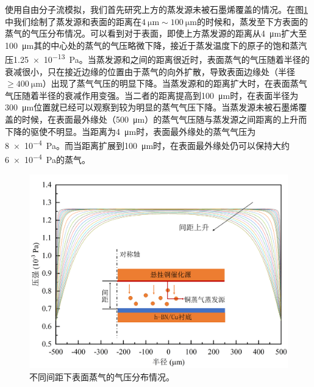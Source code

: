     使用自由分子流模拟，我们首先研究上方的蒸发源未被石墨烯覆盖的情况。在图\ref{fig:CG_FEM_fullCu}中我们绘制了蒸发源和表面的距离在$\SI{4}{\micro\meter} \sim \SI{100}{\micro\meter}$的时候和，蒸发至下方表面的蒸气的气压分布情况。可以看到对于表面，即使上方蒸发源的距离从\SI{4}{\micro\meter}扩大至\SI{100}{\micro\meter}其的中心处的蒸气的气压略微下降，接近于蒸发温度下的原子的饱和蒸汽压\SI{1.25e-13}{\pascal}。当蒸发源和之间的距离很近时，表面蒸气的气压随着半径的衰减很小，只在接近边缘的位置由于蒸气的向外扩散，导致表面边缘处（半径$\geqslant \SI{400}{\micro\meter}$）出现了蒸气气压的明显下降。当蒸发源和的距离扩大时，在表面蒸气气压随着半径的衰减作用变强。当二者的距离提高到\SI{100}{\micro\meter}时，在表面半径为\SI{300}{\micro\meter}位置就已经可以观察到较为明显的蒸气气压下降。当蒸发源未被石墨烯覆盖的时候，在表面最外缘处（\SI{500}{\micro\meter}）的蒸气气压随与蒸发源之间距离的上升而下降的驱使不明显。当距离为\SI{4}{\micro\meter}时，表面最外缘处的蒸气气压为\SI{8e-4}{\pascal}。而当距离扩展到\SI{100}{\micro\meter}时，在表面最外缘处仍可以保持大约\SI{6e-4}{\pascal}的蒸气。

    \begin{figure}[htb]
        \includegraphics{pic/CG_FEM_fullCu.png}
        \caption{不同间距下表面蒸气的气压分布情况。}
        \label{fig:CG_FEM_fullCu}
    \end{figure}


